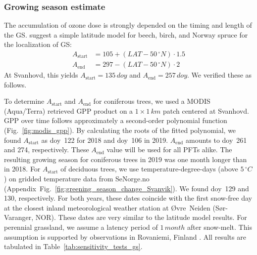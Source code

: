 \documentclass[bg, manuscript]{copernicus}
\begin{document}
\subsubsection{Growing season estimate}
\label{subsec:gs_est}

The accumulation of ozone dose is strongly depended on the timing and length of the GS. \citet{ICP:MappingManual2017} suggest a simple latitude model for beech, birch, and Norway spruce for the localization of GS:
%
\begin{align}
  A_\mathrm{start} &= 105 + (LAT-50\,\unit{^\circ N})\cdot 1.5\\
  A_\mathrm{end} &= 297 - (LAT-50\,\unit{^\circ N})\cdot 2
\end{align}
%
At Svanhovd, this yields $A_\mathrm{start}=135\,\unit{doy}$ and $A_\mathrm{end}=257\,\unit{doy}$. We verified these as follows.

To determine $A_\text{start}$ and $A_\text{end}$ for coniferous trees, we used a MODIS (Aqua/Terra) retrieved GPP product \citep{MODIS_PSN} on a $1\times 1\,\unit{km}$ patch centered at Svanhovd. GPP over time follows approximately a second-order polynomial function (Fig.~\ref{fig:modis_gpp}). By calculating the roots of the fitted polynomial, we found $A_\text{start}$ as \unit{doy}~122 for 2018 and \unit{doy}~106 in 2019. $A_\text{end}$ amounts to \unit{doy}~261 and 274, respectively. These $A_\mathrm{end}$ value will be used for all PFTs alike. The resulting growing season for coniferous trees in 2019 was one month longer than in 2018. For $A_\text{start}$ of deciduous trees, we use temperature-degree-days (above $5\,\unit{^\circ C}$) on gridded temperature data from SeNorge.no (Appendix~Fig.~\ref{fig:greening_season_change_Svanvik}). We found \unit{doy}~129 and 130, respectively. For both years, these dates coincide with the first snow-free day at the closest inland meteorological weather station at Øvre~Neiden (Sør-Varanger, NOR). These dates are very similar to the latitude model results. For perennial grassland, we assume a latency period of $1\,\unit{month}$ after snow-melt. This assumption is supported by observations in Rovaniemi, Finland \citep[][Supplement~Fig.~S1]{FCR:Korhonen2018}. All results are tabulated in Table~\ref{tab:sensitivity_tests_gs}.
\end{document}
